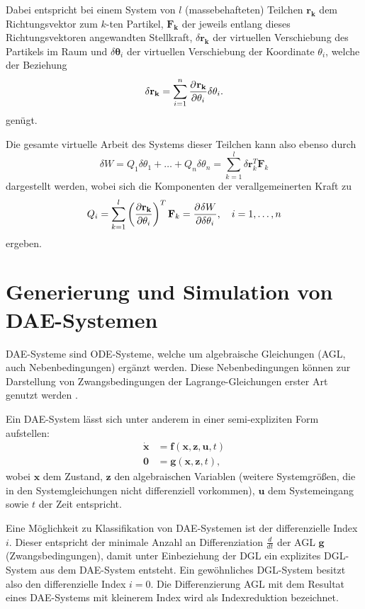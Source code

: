 Dabei entspricht bei einem System von $l$ (massebehafteten) Teilchen $\mathbf{r_k}$ dem Richtungsvektor zum $k$-ten Partikel, $\mathbf{F_k}$ der jeweils entlang dieses Richtungsvektoren angewandten Stellkraft, $\delta \mathbf{r_{k}}$ der virtuellen Verschiebung des Partikels im Raum und $\delta \mathbf{\theta}_{i}$ der virtuellen Verschiebung der Koordinate $\theta_i$, welche der Beziehung
\begin{equation}
	\delta \mathbf{r_{k}} = \sum_{i = 1}^{n} \frac{\partial^{}\mathbf{r_{k}}}{\partial{\theta_i}^{}} \delta \theta_i.
\end{equation}
genügt.

Die gesamte virtuelle Arbeit des Systems dieser Teilchen kann also ebenso durch
\begin{equation}
\delta W = Q_1 \delta \theta_1 + \ldots + Q_n\delta \theta_n = \sum_{k=1}^{l}\delta \mathbf{r}_k^T \mathbf{F}_k
\end{equation}
dargestellt werden, wobei sich die Komponenten der verallgemeinerten Kraft zu
\begin{equation}
Q_i = \sum_{k=1}^l \left(\frac {\partial \mathbf{r_k}} {\partial \theta_i} \right)^T \mathbf {F}_{k} = \frac{\partial^{}\delta W}{\partial{\delta \theta_i}^{}} ,\quad i=1,\ldots, n 
\end{equation}
ergeben.
\section{Generierung und Simulation von DAE-Systemen}
DAE-Systeme sind ODE-Systeme, welche um algebraische Gleichungen (AGL, auch Nebenbedingungen) ergänzt werden. Diese Nebenbedingungen können zur Darstellung von Zwangsbedingungen der Lagrange-Gleichungen erster Art genutzt werden \cite[S.137]{JanschekSystementwurf}. 

Ein DAE-System lässt sich unter anderem in einer semi-expliziten Form aufstellen:
	\begin{align}\label{eq:dae_std}
		\mathbf{\dot{x}} &= \mathbf{f}(\mathbf{x}, \mathbf{z}, \mathbf{u}, t) \\
		\mathbf{0} &= \mathbf{g}(\mathbf{x}, \mathbf{z}, t),
	\end{align}
wobei $\mathbf{x}$ dem Zustand, $\mathbf{z}$ den algebraischen Variablen (weitere Systemgrößen, die in den Systemgleichungen nicht differenziell vorkommen), $\mathbf{u}$ dem Systemeingang sowie $t$ der Zeit entspricht.

Eine Möglichkeit zu Klassifikation von DAE-Systemen ist der differenzielle Index $i$. Dieser entspricht der minimale Anzahl an Differenziation $\frac{d}{dt}$ der AGL $\mathbf{g}$ (Zwangsbedingungen), damit unter Einbeziehung der DGL ein explizites DGL-System aus dem DAE-System entsteht. Ein gewöhnliches DGL-System besitzt also den differenzielle Index $i = 0$. Die Differenzierung AGL mit dem Resultat eines DAE-Systems mit kleinerem Index wird als Indexreduktion bezeichnet.

